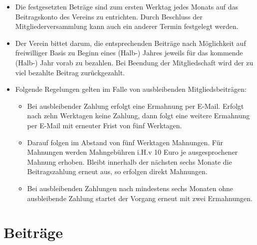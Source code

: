 \documentclass[12pt,paper=a4,ngerman]{report}
\begin{document}
\begin{itemize}
    \item Die festgesetzten Beträge sind zum ersten Werktag jedes Monats auf das Beitragskonto des Vereins zu entrichten. Durch Beschluss der Mitgliederversammlung kann auch ein anderer Termin festgelegt werden.
    \item Der Verein bittet darum, die entsprechenden Beiträge nach Möglichkeit auf freiwilliger Basis zu Beginn eines (Halb-) Jahres jeweils für das kommende (Halb-) Jahr vorab zu bezahlen. Bei Beendung der Mitgliedschaft wird der zu viel bezahlte Beitrag zurückgezahlt.
    \item Folgende Regelungen gelten im Falle von ausbleibenden Mitgliedsbeiträgen:
    
    \begin{itemize}
        \item Bei ausbleibender Zahlung erfolgt eine Ermahnung per E-Mail. Erfolgt nach zehn Werktagen keine Zahlung, dann folgt eine weitere Ermahnung per E-Mail mit erneuter Frist von fünf Werktagen.
        \item Darauf folgen im Abstand von fünf Werktagen Mahnungen. Für Mahnungen werden Mahngebühren i.H.v 10 Euro je ausgesprochener Mahnung erhoben. Bleibt innerhalb der nächsten sechs Monate die Beitragszahlung erneut aus, so erfolgen direkt Mahnungen.
        \item Bei ausbleibenden Zahlungen nach mindestens sechs Monaten ohne ausbleibende Zahlung startet der Vorgang erneut mit zwei Ermahnungen.
    \end{itemize}
\end{itemize}

\section{Beiträge}
\end{document}
